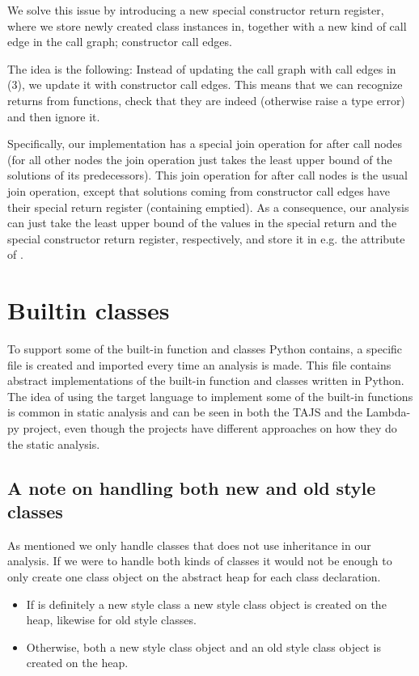 We solve this issue by introducing a new special constructor return register, where we store newly created class instances in, together with a new kind of call edge in the call graph; constructor call edges.

The idea is the following: Instead of updating the call graph with call edges in (3), we update it with constructor call edges. This means that we can recognize returns from  functions, check that they are indeed  (otherwise raise a type error) and then ignore it.

Specifically, our implementation has a special join operation for after call nodes (for all other nodes the join operation just takes the least upper bound of the solutions of its predecessors). This join operation for after call nodes is the usual join operation, except that solutions coming from constructor call edges have their special return register (containing  emptied). As a consequence, our analysis can just take the least upper bound of the values in the special return and the special constructor return register, respectively, and store it in e.g. the attribute  of .


\section{Builtin classes}
To support some of the built-in function and classes Python contains, a specific  file is created and imported every time an analysis is made. This  file contains abstract implementations of the built-in function and classes written in Python. The idea of using the target language to implement some of the built-in functions is common in static analysis and can be seen in both the TAJS\cite{tajs} and the Lambda-py\cite{lambdapy} project, even though the projects have different approaches on how they do the static analysis.


\subsection{A note on handling both new and old style classes}
As mentioned we only handle classes that does not use inheritance in our analysis. If we were to handle both kinds of classes it would not be enough to only create one class object on the abstract heap for each class declaration.

\begin{itemize}
	\item If  is definitely a new style class a new style class object is created on the heap, likewise for old style classes.
	\item Otherwise, both a new style class object and an old style class object is created on the heap.
\end{itemize}

